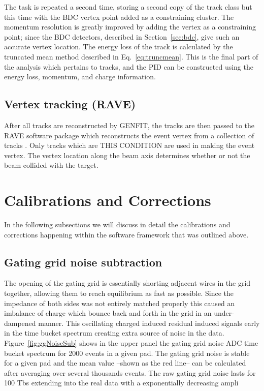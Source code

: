 The task is repeated a second time, storing a second copy of the track class but this time with the BDC vertex point added as a constraining cluster. The momentum resolution is greatly improved by adding the vertex as a constraining point; since the BDC detectors, described in Section~\ref{sec:bdc}, give such an accurate vertex location. The energy loss of the track is calculated by the truncated mean method described in Eq.~\ref{eq:truncmean}. This is the final part of the analysis which pertains to tracks, and the PID can be constructed using the energy loss, momentum, and charge information. 

\subsection{Vertex tracking (RAVE)}
\label{sec:vertex}
After all tracks are reconstructed by GENFIT, the tracks are then passed to the RAVE software package which reconstructs the event vertex from a collection of tracks \cite{rave}. Only tracks which are THIS CONDITION are used in making the event vertex. The vertex location along the beam axis determines whether or not the beam collided with the target. 


\section{Calibrations and Corrections}
In the following subsections we will discuss in detail the calibrations and corrections happening within the software framework that was outlined above.  

\subsection{Gating grid noise subtraction}
\label{sec:ggnoisesub}
The opening of the gating grid is essentially shorting adjacent wires in the grid together, allowing them to reach equilibrium as fast as possible. Since the impedance of both sides was not entirely matched properly this caused an imbalance of charge which bounce back and forth in the grid in an under-dampened manner. This oscillating charged induced  residual induced signals early in the time bucket spectrum creating extra source of noise in the data. Figure~\ref{fig:ggNoiseSub} shows in the upper panel the gating grid noise ADC time bucket spectrum for 2000 events in a given pad. The gating grid noise is stable for a given pad and the mean value --shown as the red line-- can be calculated after averaging over several thousands events. The raw gating grid noise lasts for 100 Tbs extending into the real data with a exponentially decreasing ampli 

